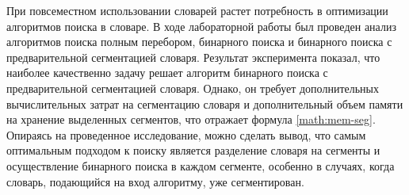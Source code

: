 При повсеместном использовании словарей растет потребность в оптимизации алгоритмов поиска в словаре. В ходе лабораторной работы был проведен анализ алгоритмов поиска полным перебором, бинарного поиска и бинарного поиска с предварительной сегментацией словаря. Результат эксперимента показал, что наиболее качественно задачу решает алгоритм бинарного поиска с предварительной сегментацией словаря. Однако, он требует дополнительных вычислительных затрат на сегментацию словаря и дополнительный объем памяти на хранение выделенных сегментов, что отражает формула \ref{math:mem-seg}. 
Опираясь на проведенное исследование, можно сделать вывод, что самым оптимальным подходом к поиску является разделение словаря на сегменты и осуществление бинарного поиска в каждом сегменте, особенно в случаях, когда словарь, подающийся на вход алгоритму, уже сегментирован. 